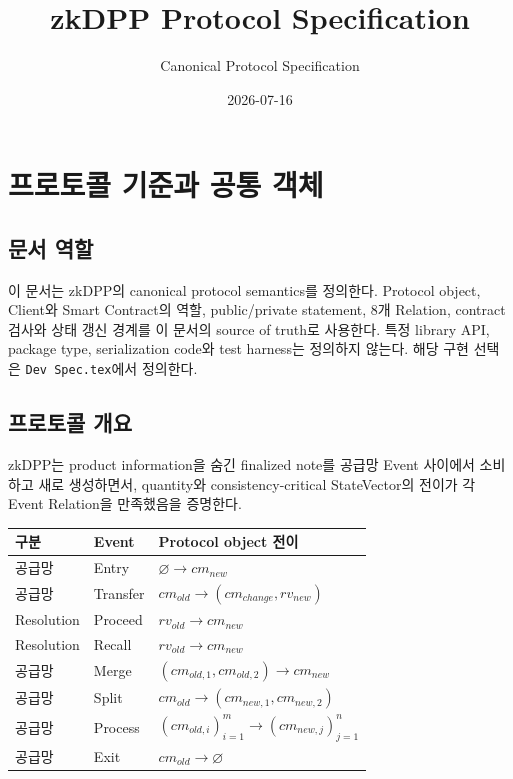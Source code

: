 \documentclass[11pt,a4paper]{extarticle}
\title{zkDPP Protocol Specification}
\author{Canonical Protocol Specification}
\date{2026-07-16}
\begin{document}
\maketitle
\tableofcontents
\newpage

\section{프로토콜 기준과 공통 객체}

\subsection{문서 역할}

이 문서는 zkDPP의 canonical protocol semantics를 정의한다. Protocol object,
Client와 Smart Contract의 역할, public/private statement, 8개 Relation, contract 검사와
상태 갱신 경계를 이 문서의 source of truth로 사용한다. 특정 library API, package type,
serialization code와 test harness는 정의하지 않는다. 해당 구현 선택은
\texttt{Dev Spec.tex}에서 정의한다.

\subsection{프로토콜 개요}

zkDPP는 product information을 숨긴 finalized note를 공급망 Event 사이에서 소비하고
새로 생성하면서, quantity와 consistency-critical StateVector의 전이가 각 Event
Relation을 만족했음을 증명한다.

\begin{center}
\begin{tabular}{lll}
\hline
구분 & Event & Protocol object 전이 \\
\hline
공급망 & Entry & $\varnothing\rightarrow cm_{new}$ \\
공급망 & Transfer & $cm_{old}\rightarrow (cm_{change},rv_{new})$ \\
Resolution & Proceed & $rv_{old}\rightarrow cm_{new}$ \\
Resolution & Recall & $rv_{old}\rightarrow cm_{new}$ \\
공급망 & Merge & $(cm_{old,1},cm_{old,2})\rightarrow cm_{new}$ \\
공급망 & Split & $cm_{old}\rightarrow (cm_{new,1},cm_{new,2})$ \\
공급망 & Process & $(cm_{old,i})_{i=1}^{m}\rightarrow(cm_{new,j})_{j=1}^{n}$ \\
공급망 & Exit & $cm_{old}\rightarrow\varnothing$ \\
\hline
\end{tabular}
\end{center}
\end{document}

